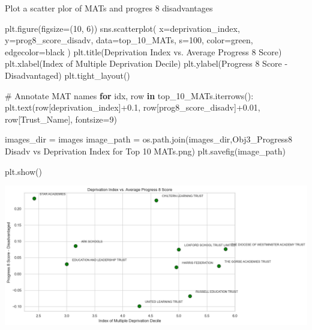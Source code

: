 \documentclass[
  letterpaper,
  DIV=11,
  numbers=noendperiod]{scrartcl}
\newenvironment{Shaded}{\begin{snugshade}}{\end{snugshade}}
\newcommand{\CommentTok}[1]{\textcolor[rgb]{0.37,0.37,0.37}{#1}}
\newcommand{\ControlFlowTok}[1]{\textcolor[rgb]{0.00,0.23,0.31}{\textbf{#1}}}
\newcommand{\DecValTok}[1]{\textcolor[rgb]{0.68,0.00,0.00}{#1}}
\newcommand{\FloatTok}[1]{\textcolor[rgb]{0.68,0.00,0.00}{#1}}
\newcommand{\KeywordTok}[1]{\textcolor[rgb]{0.00,0.23,0.31}{\textbf{#1}}}
\newcommand{\NormalTok}[1]{\textcolor[rgb]{0.00,0.23,0.31}{#1}}
\newcommand{\OperatorTok}[1]{\textcolor[rgb]{0.37,0.37,0.37}{#1}}
\newcommand{\StringTok}[1]{\textcolor[rgb]{0.13,0.47,0.30}{#1}}
\begin{document}
Plot a scatter plor of MATs and progres 8 disadvantages

\begin{Shaded}
\begin{Highlighting}[]
\NormalTok{plt.figure(figsize}\OperatorTok{=}\NormalTok{(}\DecValTok{10}\NormalTok{, }\DecValTok{6}\NormalTok{))}
\NormalTok{sns.scatterplot(}
\NormalTok{    x}\OperatorTok{=}\StringTok{\textquotesingle{}deprivation\_index\textquotesingle{}}\NormalTok{, }
\NormalTok{    y}\OperatorTok{=}\StringTok{\textquotesingle{}prog8\_score\_disadv\textquotesingle{}}\NormalTok{, }
\NormalTok{    data}\OperatorTok{=}\NormalTok{top\_10\_MATs,}
\NormalTok{    s}\OperatorTok{=}\DecValTok{100}\NormalTok{,}
\NormalTok{    color}\OperatorTok{=}\StringTok{\textquotesingle{}green\textquotesingle{}}\NormalTok{,}
\NormalTok{    edgecolor}\OperatorTok{=}\StringTok{\textquotesingle{}black\textquotesingle{}}
\NormalTok{)}
\NormalTok{plt.title(}\StringTok{\textquotesingle{}Deprivation Index vs. Average Progress 8 Score\textquotesingle{}}\NormalTok{)}
\NormalTok{plt.xlabel(}\StringTok{\textquotesingle{}Index of Multiple Deprivation Decile\textquotesingle{}}\NormalTok{)}
\NormalTok{plt.ylabel(}\StringTok{\textquotesingle{}Progress 8 Score {-} Disadvantaged\textquotesingle{}}\NormalTok{)}
\NormalTok{plt.tight\_layout()}

\CommentTok{\# Annotate MAT names}
\ControlFlowTok{for}\NormalTok{ idx, row }\KeywordTok{in}\NormalTok{ top\_10\_MATs.iterrows():}
\NormalTok{    plt.text(row[}\StringTok{\textquotesingle{}deprivation\_index\textquotesingle{}}\NormalTok{]}\OperatorTok{+}\FloatTok{0.1}\NormalTok{, row[}\StringTok{\textquotesingle{}prog8\_score\_disadv\textquotesingle{}}\NormalTok{]}\OperatorTok{+}\FloatTok{0.01}\NormalTok{, }
\NormalTok{             row[}\StringTok{\textquotesingle{}Trust\_Name\textquotesingle{}}\NormalTok{], fontsize}\OperatorTok{=}\DecValTok{9}\NormalTok{)}


\NormalTok{images\_dir }\OperatorTok{=} \StringTok{\textquotesingle{}images\textquotesingle{}}
\NormalTok{image\_path }\OperatorTok{=}\NormalTok{ os.path.join(images\_dir,}\StringTok{\textquotesingle{}Obj3\_Progress8 Disadv vs Deprivation Index for Top 10 MATs.png\textquotesingle{}}\NormalTok{)}
\NormalTok{plt.savefig(image\_path)}

\NormalTok{plt.show()}
\end{Highlighting}
\end{Shaded}

\includegraphics{P4DS_A2_Data_Analysis_Project_files/figure-pdf/cell-103-output-1.png}
\end{document}
